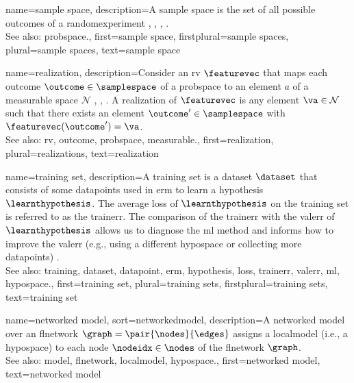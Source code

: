 {name={sample space}, 
  	description={A \gls{sample} space is the set of all possible 
		\glspl{outcome} of a \gls{randomexperiment} \cite{BillingsleyProbMeasure}, 
		\cite{BertsekasProb}, \cite{AshProbMeasure}, \cite{papoulis}. 
		\\
 		See also: \gls{probspace}.},  
  	first={sample space}, 
 	firstplural={sample spaces},
 	plural={sample spaces},
  	text={sample space}
} 
	
{name={realization},
	description={Consider an \gls{rv} $\featurevec$ that maps each \gls{outcome} 
		$\outcome \in \samplespace$ of a \gls{probspace} to an element $a$ of a \gls{measurable} space $\mathcal{N}$ 
		\cite{RudinBookPrinciplesMatheAnalysis}, \cite{BillingsleyProbMeasure}, \cite{HalmosMeasure}. 
		A realization of $\featurevec$ is any element $\va \in \mathcal{N}$ such that there exists 
		an element $\outcome' \in \samplespace$ with $\featurevec(\outcome') = \va$.
			\\
		See also: \gls{rv}, \gls{outcome}, \gls{probspace}, \gls{measurable}.}, 
	first={realization},
	plural={realizations},
	text={realization}  
}

{name={training set},
	description={A \gls{training} set is a \gls{dataset} $\dataset$ that consists of some \glspl{datapoint} used in \gls{erm} 
		to learn a \gls{hypothesis} $\learnthypothesis$. The average \gls{loss} of $\learnthypothesis$ on the 
		\gls{training} set is referred to as the \gls{trainerr}. The comparison of the \gls{trainerr} with the 
		\gls{valerr} of $\learnthypothesis$ allows us to diagnose the \gls{ml} method and informs how to improve 
		the \gls{valerr} (e.g., using a different \gls{hypospace} or collecting more \glspl{datapoint}) \cite[Sec. 6.6]{MLBasics}.
			\\
		See also: \gls{training}, \gls{dataset}, \gls{datapoint}, \gls{erm}, \gls{hypothesis}, \gls{loss}, \gls{trainerr}, \gls{valerr}, \gls{ml}, \gls{hypospace}.},
	first={training set},
	plural={training sets},
	firstplural={training sets},
	text={training set}  
}

{name={networked model},
sort={networkedmodel},
 	description={A networked \gls{model} over an \gls{flnetwork} $\graph = \pair{\nodes}{\edges}$ assigns 
   		a \gls{localmodel} (i.e., a \gls{hypospace}) to each node $\nodeidx \in \nodes$ of the \gls{flnetwork} $\graph$.
   		\\
		See also: \gls{model}, \gls{flnetwork}, \gls{localmodel}, \gls{hypospace}.}, 
   first={networked model},
   text={networked model}  
}

